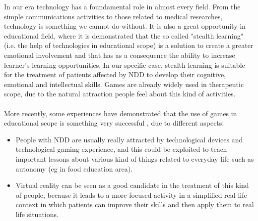 In our era technology has a foundamental role in almost every field. From the simple communications activities to those related to medical researches, technology is something we cannot do without. It is also a great opportunity in educational field, where it is demonstrated that the so called "stealth learning" (i.e. the help of technologies in educational scope) \cite{Sharp} is a solution to create a greater emotional involvement and that has as a consequence the ability to increase learner's learning opportunities. In our specific case, stealth learning is suitable for the treatment of patients affected by NDD to develop their cognitive, emotional and intellectual skills. Games are already widely used in therapeutic scope, due to the natural attraction people feel about this kind of activities. \\
\\
More recently, some experiences have demonstrated that the use of games in educational scope is something very successful \cite{Mazzone}, due to different aspects:
\begin{itemize}
\item People with NDD are usually really attracted by technological devices and technological gaming experience, and this could be exploited to teach important lessons about various kind of things related to everyday life such as autonomy (eg in food education area).
\item Virtual reality can be seen as a good candidate in the treatment of this kind of people, because it leads to a more focused activity in a simplified real-life context in which patients can improve their skills and then apply them to real life situations.
\end{itemize}


